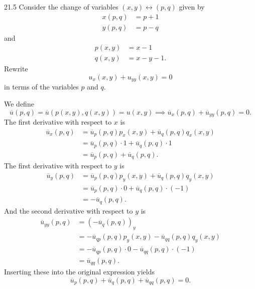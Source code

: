 
\begin{problem}{21.5}
  Consider the change of variables $(x,y) \leftrightarrow (p,q)$ given by
  \begin{align*}
    x(p,q) &= p + 1 \\
    y(p,q) &= p - q 
  \end{align*}
  and
  \begin{align*}
    p(x,y) &= x-1 \\
    q(x,y) &= x - y - 1
  .\end{align*}
  Rewrite
  \begin{equation*}
    u_x(x,y) + u_{yy}(x,y) = 0
  \end{equation*}
  in terms of the variables $p$ and $q$.
\end{problem}

\begin{derivation}
  We define
  \begin{equation*}
    \overline{u}(p,q) = \overline{u}(p(x,y), q(x,y)) = u(x,y) \implies \overline{u}_x(p,q) + \overline{u}_{yy}(p,q) = 0
  .\end{equation*}
  The first derivative with respect to $x$ is
  \begin{align*}
    \overline{u}_x(p, q) &= \overline{u}_p (p,q) p_x(x,y) + \overline{u}_q (p,q) q_x(x,y) \\
    &= \overline{u}_p (p,q) \cdot 1 + \overline{u}_q(p,q) \cdot 1 \\
    &= \overline{u}_p (p,q) + \overline{u}_q(p,q)
  .\end{align*}
  The first derivative with respect to $y$ is
  \begin{align*}
    \overline{u}_y(p, q) &= \overline{u}_p (p,q) p_y(x,y) + \overline{u}_q (p,q) q_y(x,y) \\
    &= \overline{u}_p (p,q) \cdot 0 + \overline{u}_q(p,q) \cdot (-1) \\
    &= - \overline{u}_q(p,q)
  .\end{align*}
  And the second derivative with respect to $y$ is
  \begin{align*}
    \overline{u}_{yy}(p,q) &= \left( - \overline{u}_q(p,q) \right)_y \\
    &= - \overline{u}_{qp}(p,q) p_y(x,y) - \overline{u}_{qq}(p,q) q_y(x,y) \\
    &= - \overline{u}_{qp}(p,q) \cdot 0 - \overline{u}_{qq}(p,q) \cdot (-1) \\
    &= \overline{u}_{qq}(p,q)
  .\end{align*}
  Inserting these into the original expression yields
  \begin{equation*}
    \overline{u}_p(p,q) + \overline{u}_q(p,q) + \overline{u}_{qq}(p,q) = 0 
  .\end{equation*}
\end{derivation}

